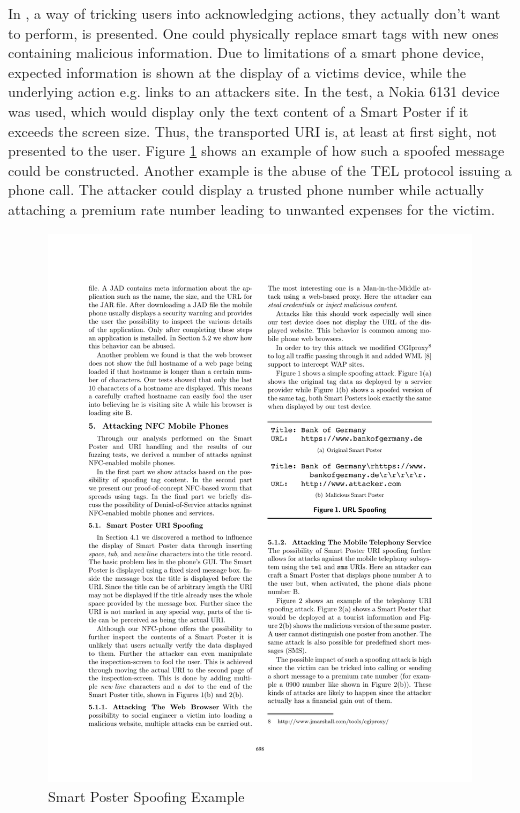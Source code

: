 \documentclass[12pt,a4paper]{article}
\begin{document}
In \cite{DBLP:conf/IEEEares/Mulliner09}, a way of tricking users into acknowledging actions, they actually don't want to perform, is presented. One could physically replace smart tags with new ones containing malicious information. Due to limitations of a smart phone device, expected information is shown at the display of a victims device, while the underlying action e.g. links to an attackers site. In the test, a Nokia 6131 device was used, which would display only the text content of a Smart Poster if it exceeds the screen size. Thus, the transported URI is, at least at first sight, not presented to the user. Figure \ref{img_smart_poster_spoofing} shows an example of how such a spoofed message could be constructed. Another example is the abuse of the TEL protocol issuing a phone call. The attacker could display a trusted phone number while actually attaching a premium rate number leading to unwanted expenses for the victim.

\begin{figure}
\begin{center}
\includegraphics{img/smart_poster_spoofing}
\caption{\footnotesize{Smart Poster Spoofing Example\cite{DBLP:conf/IEEEares/Mulliner09}}}
\label{img_smart_poster_spoofing}
\end{center}
\end{figure}
\end{document}
